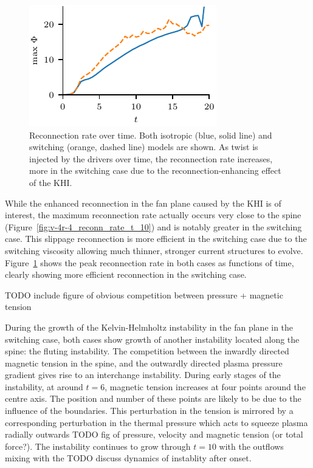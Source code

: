 \begin{figure}[t]
  \centering
  \includegraphics[width=0.5\linewidth]{v-4r-4_reconn_rate_over_time}
  \caption{Reconnection rate over time. Both isotropic (blue, solid line) and switching (orange, dashed line) models are shown. As twist is injected by the drivers over time, the reconnection rate increases, more in the switching case due to the reconnection-enhancing effect of the KHI.}%
  \label{fig:v-4r-4_reconn_rate_over_time}
\end{figure}

While the enhanced reconnection in the fan plane caused by the KHI is of interest, the maximum reconnection rate actually occurs very close to the spine (Figure~\ref{fig:v-4r-4_reconn_rate_t_10}) and is notably greater in the switching case. This slippage reconnection is more efficient in the switching case due to the switching viscosity allowing much thinner, stronger current structures to evolve. Figure~\ref{fig:v-4r-4_reconn_rate_over_time} shows the peak reconnection rate in both cases as functions of time, clearly showing more efficient reconnection in the switching case.

TODO include figure of obvious competition between pressure + magnetic tension

During the growth of the Kelvin-Helmholtz instability in the fan plane in the switching case, both cases show growth of another instability located along the spine: the fluting instability. The competition between the inwardly directed magnetic tension in the spine, and the outwardly directed plasma pressure gradient gives rise to an interchange instability. During early stages of the instability, at around $t=6$, magnetic tension increases at four points around the centre axis. The position and number of these points are likely to be due to the influence of the boundaries. This perturbation in the tension is mirrored by a corresponding perturbation in the thermal pressure which acts to squeeze plasma radially outwards TODO fig of pressure, velocity and magnetic tension (or total force?). The instability continues to grow through $t=10$ with the outflows mixing with the TODO discuss dynamics of instablity after onset. 

